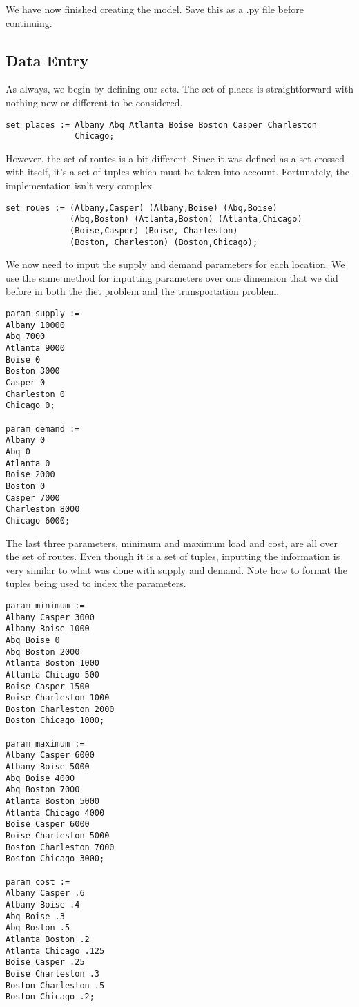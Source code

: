 \documentclass{article}
\begin{document}
We have now finished creating the model.  Save this as a .py file before continuing.

\subsection*{Data Entry}

As always, we begin by defining our sets.  The set of places is straightforward with nothing new or different to be considered.

\begin{verbatim}
set places := Albany Abq Atlanta Boise Boston Casper Charleston 
              Chicago;
\end{verbatim}

However, the set of routes is a bit different.  Since it was defined as a set crossed with itself, it's a set of tuples which must be taken into account.  Fortunately, the implementation isn't very complex

\begin{verbatim}
set roues := (Albany,Casper) (Albany,Boise) (Abq,Boise) 
             (Abq,Boston) (Atlanta,Boston) (Atlanta,Chicago) 
             (Boise,Casper) (Boise, Charleston) 
             (Boston, Charleston) (Boston,Chicago);
\end{verbatim}

We now need to input the supply and demand parameters for each location.  We use the same method for inputting parameters over one dimension that we did before in both the diet problem and the transportation problem.

\begin{verbatim}
param supply :=
Albany 10000
Abq 7000
Atlanta 9000
Boise 0
Boston 3000
Casper 0
Charleston 0
Chicago 0;

param demand :=
Albany 0
Abq 0
Atlanta 0
Boise 2000
Boston 0
Casper 7000
Charleston 8000
Chicago 6000;
\end{verbatim}

The last three parameters, minimum and maximum load and cost, are all over the set of routes.  Even though it is a set of tuples, inputting the information is very similar to what was done with supply and demand.  Note how to format the tuples being used to index the parameters.

\begin{verbatim}
param minimum :=
Albany Casper 3000
Albany Boise 1000
Abq Boise 0
Abq Boston 2000
Atlanta Boston 1000
Atlanta Chicago 500
Boise Casper 1500
Boise Charleston 1000
Boston Charleston 2000
Boston Chicago 1000;

param maximum :=
Albany Casper 6000
Albany Boise 5000
Abq Boise 4000
Abq Boston 7000
Atlanta Boston 5000
Atlanta Chicago 4000
Boise Casper 6000
Boise Charleston 5000
Boston Charleston 7000
Boston Chicago 3000;

param cost :=
Albany Casper .6
Albany Boise .4
Abq Boise .3
Abq Boston .5
Atlanta Boston .2
Atlanta Chicago .125
Boise Casper .25
Boise Charleston .3
Boston Charleston .5
Boston Chicago .2;
\end{verbatim}
\end{document}
